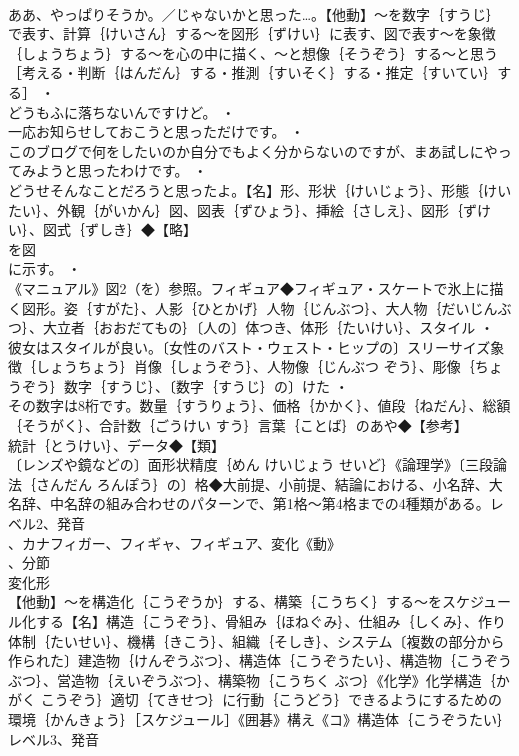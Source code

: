 \documentclass[8pt]{extreport}
\begin{document}
\begin{CJK}{UTF8}{min}
\\	ああ、やっぱりそうか。／じゃないかと思った…。【他動】～を数字｛すうじ｝で表す、計算｛けいさん｝する～を図形｛ずけい｝に表す、図で表す～を象徴｛しょうちょう｝する～を心の中に描く、～と想像｛そうぞう｝する～と思う［考える・判断｛はんだん｝する・推測｛すいそく｝する・推定｛すいてい｝する］ ・
\\	どうもふに落ちないんですけど。 ・
\\	一応お知らせしておこうと思っただけです。 ・
\\	このブログで何をしたいのか自分でもよく分からないのですが、まあ試しにやってみようと思ったわけです。 ・
\\	どうせそんなことだろうと思ったよ。【名】形、形状｛けいじょう｝、形態｛けいたい｝、外観｛がいかん｝図、図表｛ずひょう｝、挿絵｛さしえ｝、図形｛ずけい｝、図式｛ずしき｝◆【略】
\\	を図
\\	に示す。 ・
\\	《マニュアル》図2（を）参照。フィギュア◆フィギュア・スケートで氷上に描く図形。姿｛すがた｝、人影｛ひとかげ｝人物｛じんぶつ｝、大人物｛だいじんぶつ｝、大立者｛おおだてもの｝〔人の〕体つき、体形｛たいけい｝、スタイル ・
\\	彼女はスタイルが良い。〔女性のバスト・ウェスト・ヒップの〕スリーサイズ象徴｛しょうちょう｝肖像｛しょうぞう｝、人物像｛じんぶつ ぞう｝、彫像｛ちょうぞう｝数字｛すうじ｝、〔数字｛すうじ｝の〕けた ・
\\	その数字は8桁です。数量｛すうりょう｝、価格｛かかく｝、値段｛ねだん｝、総額｛そうがく｝、合計数｛ごうけい すう｝言葉｛ことば｝のあや◆【参考】
\\	統計｛とうけい｝、データ◆【類】
\\	〔レンズや鏡などの〕面形状精度｛めん けいじょう せいど｝《論理学》〔三段論法｛さんだん ろんぽう｝の〕格◆大前提、小前提、結論における、小名辞、大名辞、中名辞の組み合わせのパターンで、第1格～第4格までの4種類がある。レベル2、発音
\\	、カナフィガー、フィギャ、フィギュア、変化《動》
\\	、分節
\\	変化形 
\\	【他動】～を構造化｛こうぞうか｝する、構築｛こうちく｝する～をスケジュール化する【名】構造｛こうぞう｝、骨組み｛ほねぐみ｝、仕組み｛しくみ｝、作り体制｛たいせい｝、機構｛きこう｝、組織｛そしき｝、システム〔複数の部分から作られた〕建造物｛けんぞうぶつ｝、構造体｛こうぞうたい｝、構造物｛こうぞうぶつ｝、営造物｛えいぞうぶつ｝、構築物｛こうちく ぶつ｝《化学》化学構造｛かがく こうぞう｝適切｛てきせつ｝に行動｛こうどう｝できるようにするための環境｛かんきょう｝［スケジュール］《囲碁》構え《コ》構造体｛こうぞうたい｝レベル3、発音

\end{CJK}
\end{document}
